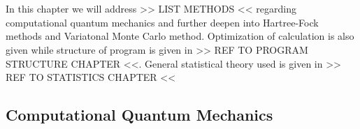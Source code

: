 \chapter{}
    In this chapter we will address >> LIST METHODS << regarding computational
    quantum mechanics and further deepen into Hartree-Fock methods and
    Variatonal Monte Carlo method. Optimization of calculation is also given
    while structure of program is given in >> REF TO PROGRAM STRUCTURE CHAPTER
    <<. General statistical theory used is given in >> REF TO STATISTICS CHAPTER <<
\section{Computational Quantum Mechanics}
